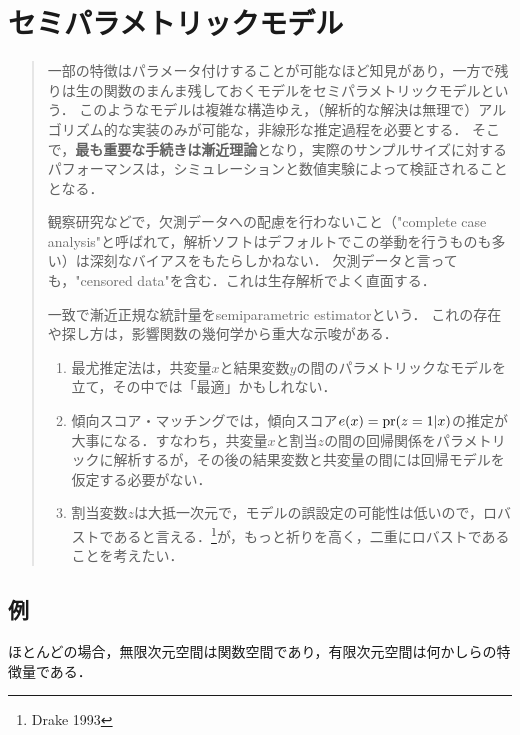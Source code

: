 \documentclass[uplatex,dvipdfmx]{jsreport}
\begin{document}
\chapter{セミパラメトリックモデル}

\begin{quotation}
    一部の特徴はパラメータ付けすることが可能なほど知見があり，一方で残りは生の関数のまんま残しておくモデルをセミパラメトリックモデルという．
    このようなモデルは複雑な構造ゆえ，（解析的な解決は無理で）アルゴリズム的な実装のみが可能な，非線形な推定過程を必要とする．
    そこで，\textbf{最も重要な手続きは漸近理論}となり，実際のサンプルサイズに対するパフォーマンスは，シミュレーションと数値実験によって検証されることとなる．

    観察研究などで，欠測データへの配慮を行わないこと（"complete case analysis"と呼ばれて，解析ソフトはデフォルトでこの挙動を行うものも多い）は深刻なバイアスをもたらしかねない．
    欠測データと言っても，"censored data"を含む．これは生存解析でよく直面する．\cite{Tsiatis}

    一致で漸近正規な統計量をsemiparametric estimatorという．
    これの存在や探し方は，影響関数の幾何学から重大な示唆がある．

    \begin{enumerate}
        \item 最尤推定法は，共変量$x$と結果変数$y$の間のパラメトリックなモデルを立て，その中では「最適」かもしれない．
        \item 傾向スコア・マッチングでは，傾向スコア$e(x)=\mathrm{pr}(z=1|x)$の推定が大事になる．すなわち，共変量$x$と割当$z$の間の回帰関係をパラメトリックに解析するが，その後の結果変数と共変量の間には回帰モデルを仮定する必要がない．
        \item 割当変数$z$は大抵一次元で，モデルの誤設定の可能性は低いので，ロバストであると言える．\footnote{Drake 1993}が，もっと祈りを高く，二重にロバストであることを考えたい．
    \end{enumerate}
\end{quotation}

\section{例}

\begin{tcolorbox}[colframe=ForestGreen, colback=ForestGreen!10!white,breakable,colbacktitle=ForestGreen!40!white,coltitle=black,fonttitle=\bfseries\sffamily,
title=]
    ほとんどの場合，無限次元空間は関数空間であり，有限次元空間は何かしらの特徴量である．
\end{tcolorbox}
\end{document}

